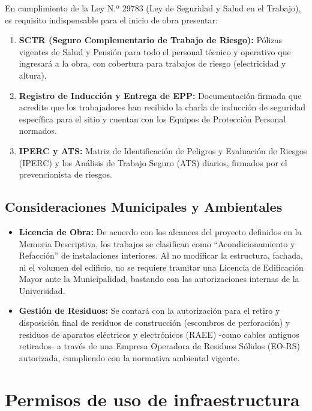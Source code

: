 En cumplimiento de la Ley N.º 29783 (Ley de Seguridad y Salud en el Trabajo), es requisito indispensable para el inicio de obra presentar:

\begin{enumerate}
    \item \textbf{SCTR (Seguro Complementario de Trabajo de Riesgo):} Pólizas vigentes de Salud y Pensión para todo el personal técnico y operativo que ingresará a la obra, con cobertura para trabajos de riesgo (electricidad y altura).
    \item \textbf{Registro de Inducción y Entrega de EPP:} Documentación firmada que acredite que los trabajadores han recibido la charla de inducción de seguridad específica para el sitio y cuentan con los Equipos de Protección Personal normados.
    \item \textbf{IPERC y ATS:} Matriz de Identificación de Peligros y Evaluación de Riesgos (IPERC) y los Análisis de Trabajo Seguro (ATS) diarios, firmados por el prevencionista de riesgos.
\end{enumerate}

\subsection*{Consideraciones Municipales y Ambientales}

\begin{itemize}
    \item \textbf{Licencia de Obra:} De acuerdo con los alcances del proyecto definidos en la Memoria Descriptiva, los trabajos se clasifican como ``Acondicionamiento y Refacción'' de instalaciones interiores. Al no modificar la estructura, fachada, ni el volumen del edificio, no se requiere tramitar una Licencia de Edificación Mayor ante la Municipalidad, bastando con las autorizaciones internas de la Universidad.
    \item \textbf{Gestión de Residuos:} Se contará con la autorización para el retiro y disposición final de residuos de construcción (escombros de perforación) y residuos de aparatos eléctricos y electrónicos (RAEE) -como cables antiguos retirados- a través de una Empresa Operadora de Residuos Sólidos (EO-RS) autorizada, cumpliendo con la normativa ambiental vigente.
\end{itemize}

\section{Permisos de uso de infraestructura}

